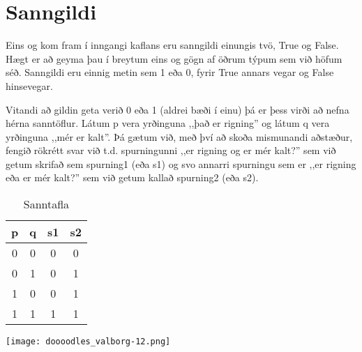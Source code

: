 \section{Sanngildi}

Eins og kom fram í inngangi kaflans eru sanngildi einungis tvö, True og False.
Hægt er að geyma þau í breytum eins og gögn af öðrum týpum sem við höfum séð.
Sanngildi eru einnig metin sem 1 eða 0, fyrir True annars vegar og False hinsevegar.

Vitandi að gildin geta verið 0 eða 1 (aldrei bæði í einu) þá er þess virði að nefna hérna sanntöflur.
Látum p vera yrðinguna ,,það er rigning'' og látum q vera yrðinguna ,,mér er kalt''.
Þá gætum við, með því að skoða mismunandi aðstæður, fengið rökrétt svar við t.d. spurningunni ,,er rigning og er mér kalt?'' sem við getum skrifað sem spurning1 (eða s1) og svo annarri spurningu sem er ,,er rigning eða er mér kalt?'' sem við getum kallað spurning2 (eða s2).

\begin{center}
\begin{table}[h]
	\centering
\caption{Sanntafla}
\vspace{6pt}
\label{tbl:sanntafla}
\begin{tabular}{|c c|c|c|}
	p & q & s1 & s2\\ 
	\hline  
	0 & 0 & 0 & 0\\
	0 & 1 & 0 & 1\\
	1 & 0 & 0 & 1\\
	1 & 1 & 1 & 1\\
	\end{tabular}

\end{table}
\end{center}

\begin{center}
	\texttt{[image: doooodles\_valborg-12.png]}
\end{center}


